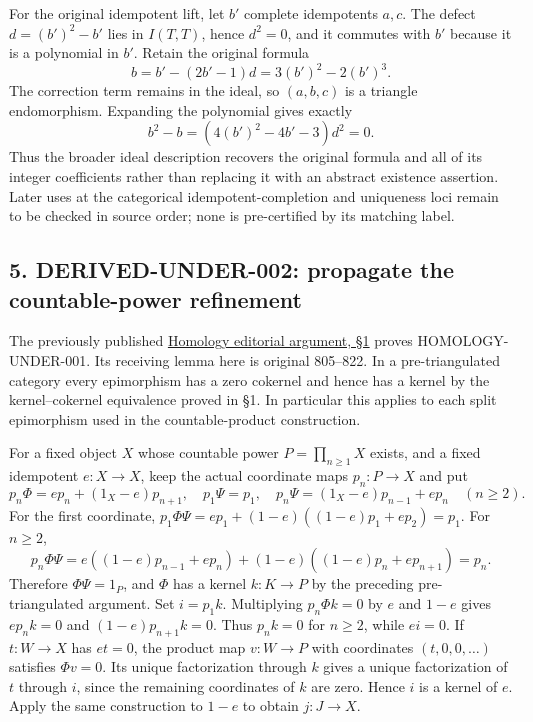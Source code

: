 For the original idempotent lift,\allowbreak{} let \(b'\) complete idempotents \(a,c\). The defect \(d=(b')^2-b'\) lies in \(I(T,T)\),\allowbreak{} hence \(d^2=0\),\allowbreak{} and it commutes with \(b'\) because it is a polynomial in \(b'\). Retain the original formula \[
b=b'-(2b'-1)d=3(b')^2-2(b')^3.
\] The correction term remains in the ideal,\allowbreak{} so \((a,b,c)\) is a triangle endomorphism. Expanding the polynomial gives exactly \[
b^2-b=(4(b')^2-4b'-3)d^2=0.
\] Thus the broader ideal description recovers the original formula and all of its integer coefficients rather than replacing it with an abstract existence assertion. Later uses at the categorical idempotent-completion and uniqueness loci remain to be checked in source order; none is pre-certified by its matching label.

\subsection{\texorpdfstring{5. DERIVED-UNDER-002:\allowbreak{} propagate the countable-power refinement}{5.  propagate the countable-power refinement}}\label{proofs-0001-1140-derived-under-002-propagate-the-countable-power-refinement}

The previously published \href{https://github.com/KokunoYumeto/unofficial-stacks-project-ai-drafts/blob/95a51593aceb247ac7a183111678c3a0f8b8f4b5/ai-integrated/candidates/commons/stacks/errata/r60/evidence/review/PROOFS_0001_1900.md}{Homology editorial argument,\allowbreak{} §1} proves HOMOLOGY-UNDER-001. Its receiving lemma here is original 805–\allowbreak{}822. In a pre-triangulated category every epimorphism has a zero cokernel and hence has a kernel by the kernel–\allowbreak{}cokernel equivalence proved in §1. In particular this applies to each split epimorphism used in the countable-product construction.

For a fixed object \(X\) whose countable power \(P=\prod_{n\ge1}X\) exists,\allowbreak{} and a fixed idempotent \(e:X\to X\),\allowbreak{} keep the actual coordinate maps \(p_n:P\to X\) and put \[
p_n\Phi=e p_n+(1_X-e)p_{n+1},\quad
p_1\Psi=p_1,\quad
p_n\Psi=(1_X-e)p_{n-1}+e p_n\quad(n\ge2).
\] For the first coordinate,\allowbreak{} \(p_1\Phi\Psi=e p_1+(1-e)((1-e)p_1+e p_2)=p_1\). For \(n\ge2\),\allowbreak{} \[
p_n\Phi\Psi=e((1-e)p_{n-1}+e p_n)
 +(1-e)((1-e)p_n+e p_{n+1})=p_n.
\] Therefore \(\Phi\Psi=1_P\),\allowbreak{} and \(\Phi\) has a kernel \(k:K\to P\) by the preceding pre-triangulated argument. Set \(i=p_1k\). Multiplying \(p_n\Phi k=0\) by \(e\) and \(1-e\) gives \(e p_nk=0\) and \((1-e)p_{n+1}k=0\). Thus \(p_nk=0\) for \(n\ge2\),\allowbreak{} while \(ei=0\). If \(t:W\to X\) has \(et=0\),\allowbreak{} the product map \(v:W\to P\) with coordinates \((t,0,0,\ldots)\) satisfies \(\Phi v=0\). Its unique factorization through \(k\) gives a unique factorization of \(t\) through \(i\),\allowbreak{} since the remaining coordinates of \(k\) are zero. Hence \(i\) is a kernel of \(e\). Apply the same construction to \(1-e\) to obtain \(j:J\to X\).

